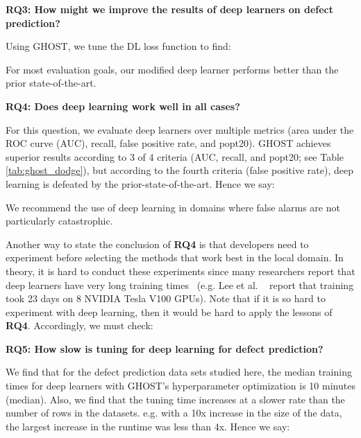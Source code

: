 \documentclass[10pt,compsoc,twocolumn]{IEEEtran}
\begin{document}
\textbf{RQ3: How might we improve the results of deep learners on defect prediction?}

Using GHOST, we tune the DL loss function to find:

\begin{blockquote}
    \noindent
 For most evaluation goals,
    our modified   deep learner performs better than the prior state-of-the-art.
\end{blockquote}


%


\textbf{RQ4: Does deep learning work well in all cases?}

For this question,
we evaluate deep learners over multiple metrics
(area under the ROC curve (AUC), recall, false positive rate, and popt20).  GHOST   achieves superior results according to 3 of 4 criteria (AUC, recall, and popt20; see Table \ref{tab:ghost_dodge}), but
according to the fourth criteria (false positive rate), deep learning is 
defeated by the prior-state-of-the-art. Hence we say:

\begin{blockquote}
    \noindent
    We recommend the use of deep learning in domains where false alarms are not particularly catastrophic. 
\end{blockquote}
\noindent

Another way to state the conclusion of {\bf RQ4} is that
developers need to experiment  before selecting the methods that work best  in the local domain. In theory, it is hard to conduct these experiments
since   many researchers report that deep learners have very long training times~\cite{lee2020biobert, brown2020language} (e.g. Lee et al. ~\cite{lee2020biobert} report that training took 23 days on 8 NVIDIA Tesla V100 GPUs). 
Note that if  it is so hard to experiment with deep learning,
then it would be hard to apply the lessons of {\bf RQ4}.
Accordingly, we must check:

\textbf{RQ5: How slow is tuning for 
deep learning for defect prediction?}


We find that for the defect prediction data sets studied here, the  median training times for deep learners  with GHOST's hyperparameter optimization is 10 minutes  (median).
Also,
we find that the tuning time increases at a slower rate than the number of rows in the datasets. e.g. with a 10x increase in the size of the data, the largest increase in the runtime was less than 4x. 
Hence we say:
\end{document}
